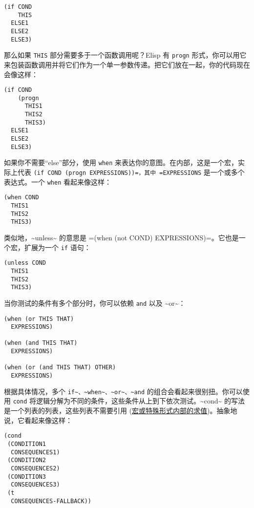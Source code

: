 \documentclass[11pt]{ctexart}
\begin{document}
\begin{verbatim}
(if COND
    THIS
  ELSE1
  ELSE2
  ELSE3)
\end{verbatim}

那么如果 \texttt{THIS} 部分需要多于一个函数调用呢？Elisp 有 \texttt{progn} 形式，你可以用它来包装函数调用并将它们作为一个单一参数传递。把它们放在一起，你的代码现在会像这样：

\begin{verbatim}
(if COND
    (progn
      THIS1
      THIS2
      THIS3)
  ELSE1
  ELSE2
  ELSE3)
\end{verbatim}

如果你不需要“else”部分，使用 \texttt{when} 来表达你的意图。在内部，这是一个宏，实际上代表 \texttt{(if COND (progn EXPRESSIONS))=，其中 =EXPRESSIONS} 是一个或多个表达式。一个 \texttt{when} 看起来像这样：

\begin{verbatim}
(when COND
  THIS1
  THIS2
  THIS3)
\end{verbatim}

类似地，\textasciitilde{}unless\textasciitilde{} 的意思是 =(when (not COND) EXPRESSIONS)=。它也是一个宏，扩展为一个 \texttt{if} 语句：

\begin{verbatim}
(unless COND
  THIS1
  THIS2
  THIS3)
\end{verbatim}

当你测试的条件有多个部分时，你可以依赖 \texttt{and} 以及 \textasciitilde{}or\textasciitilde{}：

\begin{verbatim}
(when (or THIS THAT)
  EXPRESSIONS)

(when (and THIS THAT)
  EXPRESSIONS)

(when (or (and THIS THAT) OTHER)
  EXPRESSIONS)
\end{verbatim}

根据具体情况，多个 \texttt{if\textasciitilde{}、\textasciitilde{}when\textasciitilde{}、\textasciitilde{}or\textasciitilde{}、\textasciitilde{}and} 的组合会看起来很别扭。你可以使用 \texttt{cond} 将逻辑分解为不同的条件，这些条件从上到下依次测试。\textasciitilde{}cond\textasciitilde{} 的写法是一个列表的列表，这些列表不需要引用 (\hyperref[sec:org6bfc8f0]{宏或特殊形式内部的求值})。抽象地说，它看起来像这样：

\begin{verbatim}
(cond
 (CONDITION1
  CONSEQUENCES1)
 (CONDITION2
  CONSEQUENCES2)
 (CONDITION3
  CONSEQUENCES3)
 (t
  CONSEQUENCES-FALLBACK))
\end{verbatim}
\end{document}
